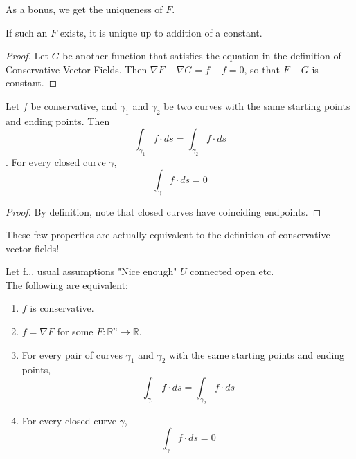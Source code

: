 \documentclass[11pt,openany]{book}
\newcommand{\proposition}[1]{\begin{tcolorbox}[title=Proposition,colframe=red!50!blue!20!white,colback=red!35!blue!10!white, coltitle=black]{#1}\end{tcolorbox}
}
\newcommand{\theorem}[2]{\begin{tcolorbox}[title=Theorem ({#1}),colframe=red!70!black,colback=red!5!white]{#2}\end{tcolorbox}
}
\begin{document}
	As a bonus, we get the uniqueness of $F$.
	\proposition{
		If such an $F$ exists, it is unique up to addition of a constant.
	}
	\begin{proof}
		Let $G$ be another function that satisfies the equation in the definition of Conservative Vector Fields. Then $\nabla F - \nabla G = f-f =0$, so that $F-G$ is constant.
	\end{proof}
	
	\proposition{
	Let $f$ be conservative, and $\gamma_1$ and $\gamma_2$ be two curves with the same starting points and ending points. Then \[
		\int_{\gamma_1} f \cdot ds = \int_{\gamma_2} f \cdot ds
	\].
	For every closed curve $\gamma$,
	\[
	\int_\gamma f\cdot ds = 0
	\]
	}
	
	\begin{proof}
		By definition, note that closed curves have coinciding endpoints.
	\end{proof}
	These few properties are actually equivalent to the definition of conservative vector fields!
	\theorem{Equivalent definitions of conservative vector fields}{
		Let f... usual assumptions "Nice enough" $U$ connected open etc.\\
		The following are equivalent:
		\begin{enumerate}
			\item $f$ is conservative.
			\item $f = \nabla F$ for some $F:\mathbb{R}^n \to \mathbb{R}$.
			\item For every pair of curves $\gamma_1$ and $\gamma_2$ with the same starting points and ending points, \[
			\int_{\gamma_1} f \cdot ds = \int_{\gamma_2} f \cdot ds
			\]
			\item For every closed curve $\gamma$,
			\[
			\int_\gamma f\cdot ds = 0
			\]
		\end{enumerate}
	}
\end{document}

